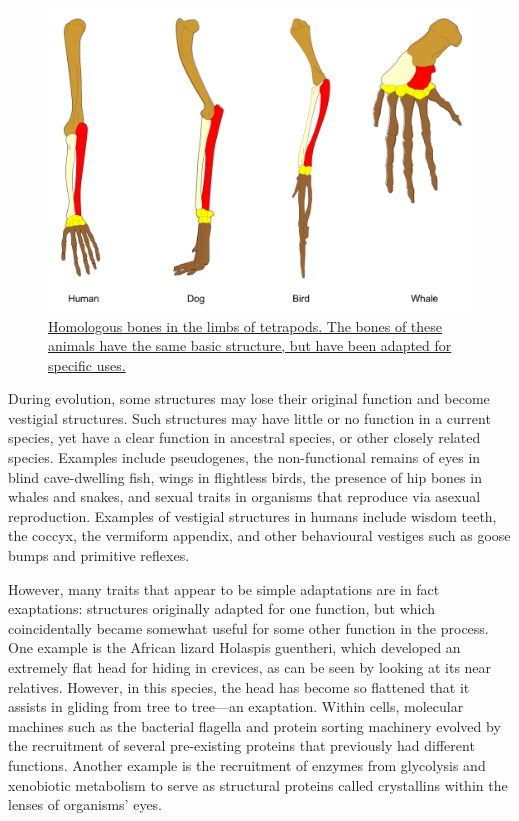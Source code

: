 \begin{figure}

{\centering \includegraphics[width=0.7\linewidth]{./figures/evolution/Homology_vertebrates-en} 

}

\caption{\href{https://commons.wikimedia.org/wiki/File:Homology_vertebrates-en.svg}{Homologous bones in the limbs of tetrapods. The bones of these animals have the same basic structure, but have been adapted for specific uses.}}\label{fig:homologousbones}
\end{figure}

During evolution, some structures may lose their original function and become vestigial structures. Such structures may have little or no function in a current species, yet have a clear function in ancestral species, or other closely related species. Examples include pseudogenes, the non-functional remains of eyes in blind cave-dwelling fish, wings in flightless birds, the presence of hip bones in whales and snakes, and sexual traits in organisms that reproduce via asexual reproduction. Examples of vestigial structures in humans include wisdom teeth, the coccyx, the vermiform appendix, and other behavioural vestiges such as goose bumps and primitive reflexes.

However, many traits that appear to be simple adaptations are in fact exaptations: structures originally adapted for one function, but which coincidentally became somewhat useful for some other function in the process. One example is the African lizard Holaspis guentheri, which developed an extremely flat head for hiding in crevices, as can be seen by looking at its near relatives. However, in this species, the head has become so flattened that it assists in gliding from tree to tree---an exaptation. Within cells, molecular machines such as the bacterial flagella and protein sorting machinery evolved by the recruitment of several pre-existing proteins that previously had different functions. Another example is the recruitment of enzymes from glycolysis and xenobiotic metabolism to serve as structural proteins called crystallins within the lenses of organisms' eyes.

